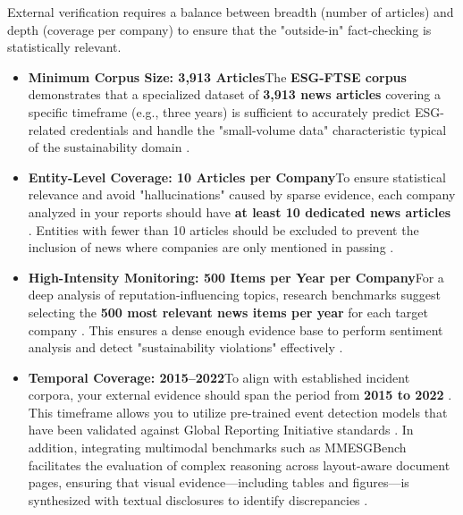 \documentclass{article}
\begin{document}
External verification requires a balance between breadth (number of articles) and depth (coverage per company) to ensure that the "outside-in" fact-checking is statistically relevant.
\begin{itemize}
\item 

\textbf{Minimum Corpus Size: 3,913 Articles}The \textbf{ESG-FTSE corpus} demonstrates that a specialized dataset of \textbf{3,913 news articles} covering a specific timeframe (e.g., three years) is sufficient to accurately predict ESG-related credentials and handle the "small-volume data" characteristic typical of the sustainability domain  \parencite{mariya_pavlova_259be499}.\item 

\textbf{Entity-Level Coverage: 10 Articles per Company}To ensure statistical relevance and avoid "hallucinations" caused by sparse evidence, each company analyzed in your reports should have \textbf{at least 10 dedicated news articles}  \parencite{sergio_consoli_fa6a8a6b}. Entities with fewer than 10 articles should be excluded to prevent the inclusion of news where companies are only mentioned in passing  \parencite{sergio_consoli_fa6a8a6b}.\item 

\textbf{High-Intensity Monitoring: 500 Items per Year per Company}For a deep analysis of reputation-influencing topics, research benchmarks suggest selecting the \textbf{500 most relevant news items per year} for each target company  \parencite{naiara_pikatza_gorrotxategi_17f5b4de}. This ensures a dense enough evidence base to perform sentiment analysis and detect "sustainability violations" effectively  \parencite{naiara_pikatza_gorrotxategi_17f5b4de}.\item 

\textbf{Temporal Coverage: 2015–2022}To align with established incident corpora, your external evidence should span the period from \textbf{2015 to 2022}  \parencite{abir_naskar_17efeb7b}. This timeframe allows you to utilize pre-trained event detection models that have been validated against Global Reporting Initiative standards  \parencite{abir_naskar_17efeb7b}. In addition, integrating multimodal benchmarks such as MMESGBench facilitates the evaluation of complex reasoning across layout-aware document pages, ensuring that visual evidence—including tables and figures—is synthesized with textual disclosures to identify discrepancies  \parencite{lei_zhang_a313a4b2}. 
\end{itemize}
\end{document}
